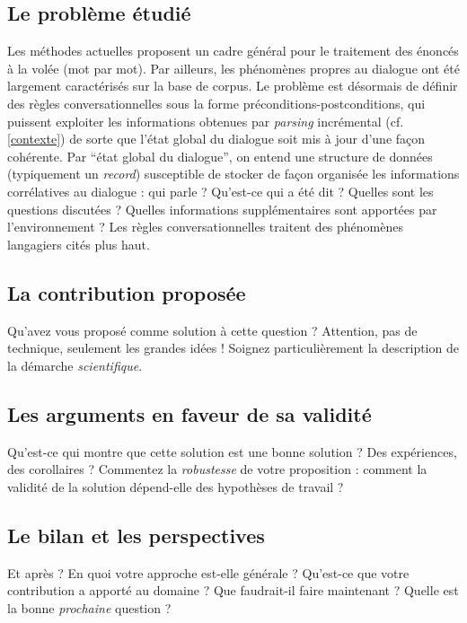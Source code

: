 \documentclass[11pt]{article}
\begin{document}
	\subsection*{Le problème étudié}
	Les méthodes actuelles proposent un cadre général pour le traitement des énoncés à la volée (mot par mot). Par ailleurs, les phénomènes propres au dialogue ont été largement caractérisés sur la base de corpus. Le problème est désormais de définir des règles conversationnelles sous la forme préconditions-postconditions, qui puissent exploiter les informations obtenues par \textit{parsing} incrémental (cf. \ref{contexte}) de sorte que l'état global du dialogue soit mis à jour d'une façon cohérente. Par ``état global du dialogue'', on entend une structure de données (typiquement un \textit{record}) susceptible de stocker de façon organisée les informations corrélatives au dialogue : qui parle ? Qu'est-ce qui a été dit ? Quelles sont les questions discutées ? Quelles informations supplémentaires sont apportées par l'environnement ? Les règles conversationnelles traitent des phénomènes langagiers cités plus haut.
	
	
	\subsection*{La contribution proposée}
	
	Qu'avez vous proposé comme solution à cette question ? 
	Attention, pas de technique, seulement les grandes idées ! 
	Soignez particulièrement la description de la démarche \emph{scientifique}.
	
	\subsection*{Les arguments en faveur de sa validité}
	
	Qu'est-ce qui montre que cette solution est une bonne solution ?
	Des expériences, des corollaires ? 
	Commentez la \emph{robustesse} de votre proposition : 
	comment la validité de la solution dépend-elle des hypothèses de travail ?
	
	\subsection*{Le bilan et les perspectives}
	
	Et après ? En quoi votre approche est-elle générale ? 
	Qu'est-ce que votre contribution a apporté au domaine ? 
	Que faudrait-il faire maintenant ? 
	Quelle est la bonne \emph{prochaine} question ?
\end{document}
